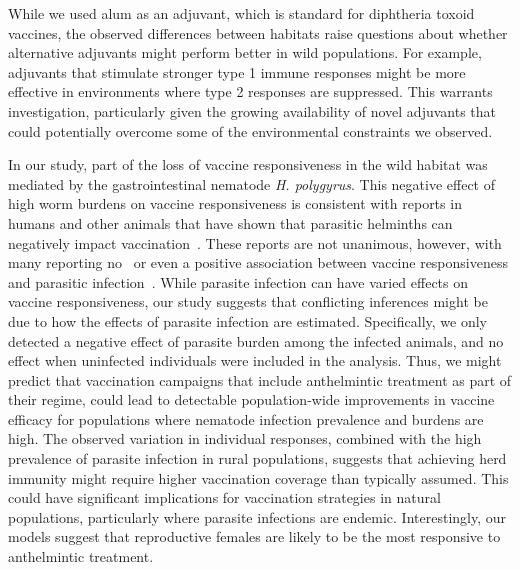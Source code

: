 \documentclass[a4paper, hidelinks, 11pt]{article}
\begin{document}
While we used alum as an adjuvant, which is standard for diphtheria toxoid vaccines, the observed differences between habitats raise questions about whether alternative adjuvants might perform better in wild populations. For example, adjuvants that stimulate stronger type 1 immune responses might be more effective in environments where type 2 responses are suppressed. This warrants investigation, particularly given the growing availability of novel adjuvants that could potentially overcome some of the environmental constraints we observed.

In our study, part of the loss of vaccine responsiveness in the wild habitat was mediated by the gastrointestinal nematode \textit{H. polygyrus}. This negative effect of high worm burdens on vaccine responsiveness is consistent with reports in humans and other animals that have shown that parasitic helminths can negatively impact vaccination~\cite{Elias2008, deRuiter2020, Tweyongyere2019, Cooper2001b, Urban2007}. These reports are not unanimous, however, with many reporting no~\cite{Bruckner2015} or even a positive association between vaccine responsiveness and parasitic infection~\cite{Wait2020, Natukunda2022}. While parasite infection can have varied effects on vaccine responsiveness, our study suggests that conflicting inferences might be due to how the effects of parasite infection are estimated. Specifically, we only detected a negative effect of parasite burden among the infected animals, and no effect when uninfected individuals were included in the analysis. Thus, we might predict that vaccination campaigns that include anthelmintic treatment as part of their regime, could lead to detectable population-wide improvements in vaccine efficacy for populations where nematode infection prevalence and burdens are high. The observed variation in individual responses, combined with the high prevalence of parasite infection in rural populations, suggests that achieving herd immunity might require higher vaccination coverage than typically assumed. This could have significant implications for vaccination strategies in natural populations, particularly where parasite infections are endemic. Interestingly, our models suggest that reproductive females are likely to be the most responsive to anthelmintic treatment.
\end{document}
